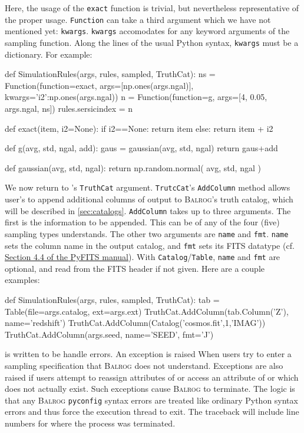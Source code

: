 \documentclass[11pt]{book}
\newcommand{\codett}[1]{\lstinline{#1}}
\newcommand{\py}{Python}
\newcommand{\pyconfig}{\codett{pyconfig}}
\newcommand{\balrog}{\textsc{Balrog}}
\newcommand{\cf}{cf.}
\begin{document}
\noindent Here, the usage of the \codett{exact} function is trivial, but nevertheless
representative of the proper usage.
\codett{Function} can take a third argument which we have not mentioned yet: \codett{kwargs}.
\codett{kwargs} accomodates for any keyword arguments of the sampling function.
Along the lines of the usual \py{} syntax, \codett{kwargs} must be a dictionary.
For example:

\begin{code}
def SimulationRules(args, rules, sampled, TruthCat):
    ns = Function(function=exact, args=[np.ones(args.ngal)], kwargs={'i2':np.ones(args.ngal)})
    n = Function(function=g, args=[4, 0.05, args.ngal, ns])
    rules.sersicindex = n

def exact(item, i2=None):
    if i2==None:
        return item
    else:
        return item + i2

def g(avg, std, ngal, add):
    gaus = gaussian(avg, std, ngal)
    return gaus+add

def gaussian(avg, std, ngal):
    return np.random.normal( avg, std, ngal )
\end{code}


\hypertarget{hyper:addtruth}{}
We now return to \simfunc{}'s \codett{TruthCat} argument.
\codett{TrutcCat}'s \codett{AddColumn} method allows user's to append additional columns of output
to \balrog{}'s truth catalog, which will be described in \autoref{sec:catalogs}.
\codett{AddColumn} takes up to three arguments.
The first is the information to be appended. This can be of any of the four (five) sampling types \simrules{} understands.
The other two arguments are \codett{name} and \codett{fmt}.
\codett{name} sets the column name in the output catalog, and \codett{fmt} sets its FITS datatype 
(\cf{} \href{http://www.ast.uct.ac.za/~ims/teaching/comp\_astron/python\_manuals/pyfits\_manual.pdf}{Section 4.4 of the PyFITS manual}).
With \codett{Catalog}/\codett{Table}, \codett{name} and \codett{fmt} are optional, and read from the FITS header if not given.
Here are a couple examples:
\begin{code}
def SimulationRules(args, rules, sampled, TruthCat):
    tab = Table(file=args.catalog, ext=args.ext)
    TruthCat.AddColumn(tab.Column('Z'), name='redshift')
    TruthCat.AddColumn(Catalog('cosmos.fit',1,'IMAG'))
    TruthCat.AddColumn(args.seed, name='SEED', fmt='J')
\end{code}

\simfunc{} is written to be handle errors.
An exception is raised When users try to enter a sampling specification that \balrog{} does not understand.
Exceptions are also raised if users attempt to reassign attributes of \simsamp{} or 
access an attribute of \simrules{} or \simsamp{} which does not actually exist.
Such exceptions cause \balrog{} to terminate.
The logic is that any \balrog{} \pyconfig{} syntax errors are treated like ordinary \py{} syntax
errors and thus force the execution thread to exit.
The traceback will include line numbers for where the process was terminated.
\end{document}
